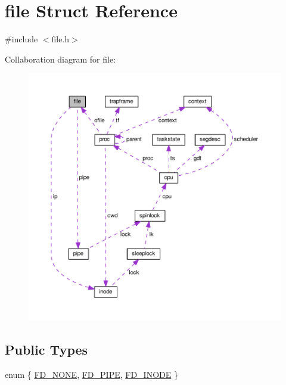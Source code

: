 \hypertarget{structfile}{}\section{file Struct Reference}
\label{structfile}


{\ttfamily \#include $<$file.\+h$>$}



Collaboration diagram for file\+:\nopagebreak
\begin{figure}[H]
\begin{center}
\leavevmode
\includegraphics[width=350pt]{d9/da3/structfile__coll__graph}
\end{center}
\end{figure}
\subsection*{Public Types}
\begin{DoxyCompactItemize}
\item 
enum \{ \hyperlink{structfile_a4aeeba6a286e58966d853aa1f510d3d5a224e095442d50a6bd1058fd742fb68c7}{F\+D\+\_\+\+N\+O\+NE}, 
\hyperlink{structfile_a4aeeba6a286e58966d853aa1f510d3d5a59fcf59caf6e70c3cc3cc48291b89752}{F\+D\+\_\+\+P\+I\+PE}, 
\hyperlink{structfile_a4aeeba6a286e58966d853aa1f510d3d5aa5d8c5e0d95ed88367e96ecebfdf326d}{F\+D\+\_\+\+I\+N\+O\+DE}
 \}
\end{DoxyCompactItemize}
